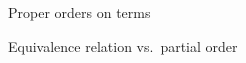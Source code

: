 \documentclass{clseminar}
\begin{document}
\providecommand{\ctx}{C}
\providecommand{\ctxhole}{[]}

\begin{figure}
    \begin{center}

\caption{Proper orders on terms}
    \end{center}
\end{figure}

\begin{figure}
    \begin{center}

\caption{Equivalence relation vs.~partial order}
\end{center}
\end{figure}
\end{document}
